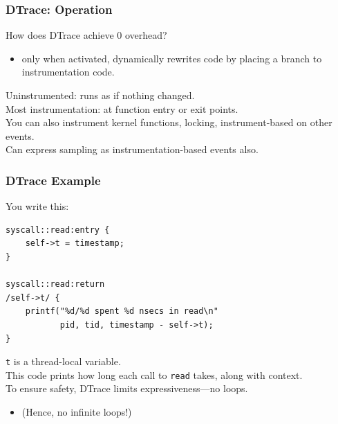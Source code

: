 \begin{frame}
  \frametitle{DTrace: Operation}


\begin{changemargin}{1.5cm}

    How does DTrace achieve 0 overhead?\\
\begin{itemize}
    \item only when activated, dynamically rewrites code by placing a branch to
      instrumentation code.
\end{itemize}

    Uninstrumented: runs as if nothing changed.\\[1em]

    Most instrumentation: at function entry or exit points.\\
    You can also instrument kernel functions, locking, instrument-based
      on other events.\\[1em]

    Can express sampling as instrumentation-based events also.
    \end{changemargin}
\end{frame}

\begin{frame}[fragile]
  \frametitle{DTrace Example}


\begin{changemargin}{1cm}

  You write this:

  \begin{lstlisting}
syscall::read:entry {
    self->t = timestamp;
}

syscall::read:return
/self->t/ {
    printf("%d/%d spent %d nsecs in read\n"
           pid, tid, timestamp - self->t);
}
  \end{lstlisting}

    {\tt t} is a thread-local variable.\\
    This code prints how long each call to {\tt read} takes, along with
      context.\\[1em]
    To ensure safety, DTrace limits expressiveness---no loops.
      \begin{itemize}
        \item (Hence, no infinite loops!)
      \end{itemize}
      \end{changemargin}

\end{frame}


